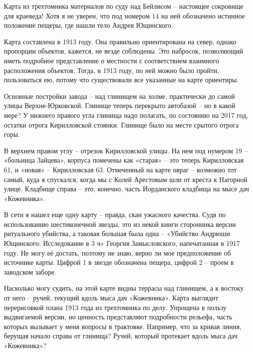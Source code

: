 Карта из трехтомника материалов по суду над Бей\-лисом\cite{beylisdelo} – настоящее сокровище для краеведа! Хотя я не уверен, что под номером 14 на ней обозначено истинное положение пещеры, где нашли тело Андрея Ющинского.

Карта составлена в 1913 году. Она правильно ориентирована на север, однако пропорции объектов, кажется, не везде соблюдены. Это набросок, позволяющий иметь подробное представление о местности с соответствием взаимного расположения объектов. Тогда, в 1913 году, по ней можно было пройти, пользоваться ею, потому что существовали все указанные на карте ориентиры.

Основные постройки завода – над глинищем на холме, практически до самой улицы Верхне-Юрковской. Глинище теперь перекрыто автобазой – но в какой мере? У нижнего правого угла глинища надо полагать, по состоянию на 2017 год, остатки отрога Кирилловской стоянки. Глинище было на месте срытого отрога горы.

В верхнем правом углу – отрезок Кирилловской улицы. На нем под нумером 19 – «больница Зайцева», корпуса помечены как «старая» – это теперь Кирилловская 61, и «новая» – Кирилловская 63. Отмеченный на карте овраг – возможно тот самый, куда я спускался, когда мы с Колей Арестовым шли от креста к Нагорной улице. Кладбище справа – это, конечно, часть Иорданского кладбища на мысе дач «Кожевника».

В сети я нашел еще одну карту – правда, скан ужасного качества. Судя по использованию шестиконечной звезды, это из некой книги сторонника версии ритуального убийства, а таковая большая была одна – «Убийство Андрюши Ющинского: Исследование в 3 ч» Георгия Замысловского, напечатанная в 1917 году. Не могу её достать, поэтому не знаю, верно ли мое предположение об источнике карты. Цифрой 1 в звезде обозначена пещера, цифрой 2 – проем в заводском заборе.

Насколько могу судить, на этой карте видны террасы над глинищем, а к востоку от него – ручей, текущий вдоль мыса дач «Кожевника». Карта выглядит перерисовкой плана 1913 года из трехтомника по делу. Упрощена в пользу выдвигаемой версии, но ценность представляют подробности рельефа, часть которых вызывает у меня вопросы в трактовке. Например, что за кривая линия, берущая начало справа от глинища? Ручей, который протекает вдоль мыса дач «Кожевника»? 

